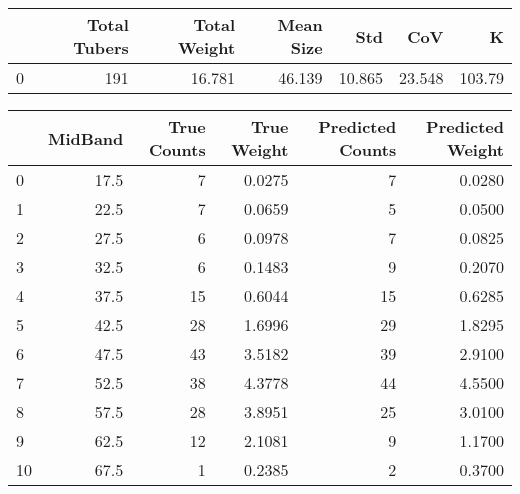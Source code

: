 \begin{tabular}{lrrrrrr}
\toprule
{} &  Total Tubers &  Total Weight &  Mean Size &     Std &     CoV &       K \\
\midrule
0 &           191 &        16.781 &     46.139 &  10.865 &  23.548 &  103.79 \\
\bottomrule
\end{tabular}

\begin{tabular}{lrrrrr}
\toprule
{} &  MidBand &  True Counts &  True Weight &  Predicted Counts &  Predicted Weight \\
\midrule
0  &     17.5 &            7 &       0.0275 &                 7 &            0.0280 \\
1  &     22.5 &            7 &       0.0659 &                 5 &            0.0500 \\
2  &     27.5 &            6 &       0.0978 &                 7 &            0.0825 \\
3  &     32.5 &            6 &       0.1483 &                 9 &            0.2070 \\
4  &     37.5 &           15 &       0.6044 &                15 &            0.6285 \\
5  &     42.5 &           28 &       1.6996 &                29 &            1.8295 \\
6  &     47.5 &           43 &       3.5182 &                39 &            2.9100 \\
7  &     52.5 &           38 &       4.3778 &                44 &            4.5500 \\
8  &     57.5 &           28 &       3.8951 &                25 &            3.0100 \\
9  &     62.5 &           12 &       2.1081 &                 9 &            1.1700 \\
10 &     67.5 &            1 &       0.2385 &                 2 &            0.3700 \\
\bottomrule
\end{tabular}

